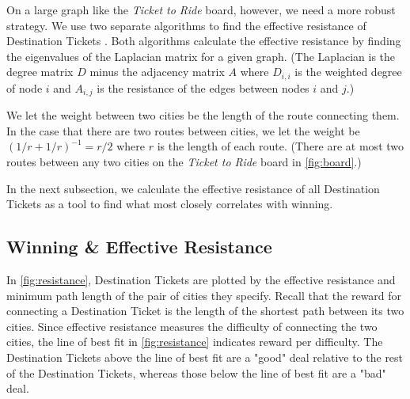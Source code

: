 On a large graph like the \textit{Ticket to Ride}
board, however, we need a more robust strategy.
We use two separate algorithms to find the effective resistance
of Destination Tickets
\cite{ellens2011effective, wu2004theory}.
Both algorithms calculate the effective resistance by finding 
the eigenvalues of the Laplacian matrix for a given graph.
(The Laplacian is the degree matrix $D$ minus the adjacency
matrix $A$ where $D_{i,i}$ is the weighted degree of node $i$
and $A_{i,j}$ is the resistance of the edges between nodes
$i$ and $j$.)

We let the weight between two cities be the length
of the route connecting them.
In the case that there are two routes between cities,
we let the weight be $(1/r + 1/r)^{-1}=r/2$ where
$r$ is the length of each route.
(There are at most two routes between any two cities
on the \textit{Ticket to Ride} board 
in \cref{fig:board}.)

In the next subsection, we calculate the effective
resistance of all Destination Tickets as a tool
to find what most closely correlates with winning.

\subsection{Winning \& Effective Resistance}
\label{sec:winning_and_resistance}

In \cref{fig:resistance},
Destination Tickets are plotted by 
the effective resistance 
and minimum path length of the pair of cities they specify.
Recall that the reward for connecting a Destination Ticket
is the length of the shortest path between its two cities.
Since effective resistance measures the difficulty of
connecting the two cities, the line of best fit in \cref{fig:resistance}
indicates reward per difficulty.
The Destination Tickets above the line of best fit are
a "good" deal relative to the rest of the Destination Tickets,
whereas those below the line of best fit are a "bad" deal.

